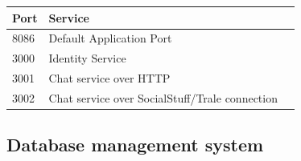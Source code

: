 \begin{table}[H]
    \centering
    \begin{tabular}{|l|l|l|}
        \toprule
        \textbf{Port} & \textbf{Service}                               \\
        \midrule
        8086          & Default Application Port                       \\
        \midrule
        3000          & Identity Service                               \\
        \midrule
        3001          & Chat service over HTTP                         \\
        \midrule
        3002          & Chat service over SocialStuff/Trale connection \\
        \bottomrule
    \end{tabular}\label{tab:table}
\end{table}

\subsection{Database management system}\label{subsec:database-management-system}

\lipsum[2-4]
